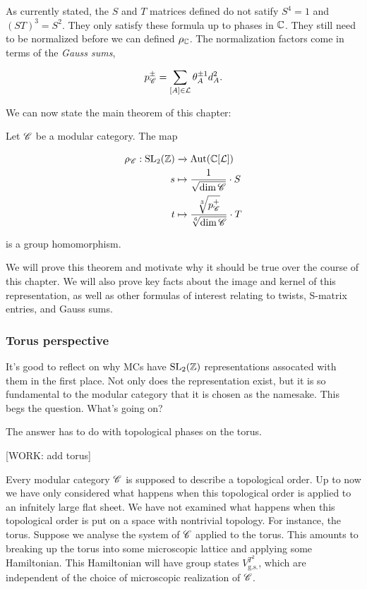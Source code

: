 As currently stated, the $S$ and $T$ matrices defined do not satify $S^4=1$ and $(ST)^3=S^2$. They only satisfy these formula up to phases in $\mathbb{C}$. They still need to be normalized before we can defined $\rho_{\mathbb{C}}$. The normalization factors come in terms of the \textit{Gauss sums},

$$p^{\pm}_{\mathscr{C}}=\sum_{[A]\in \mathcal{L}}\theta_A^{\pm 1}d_A^2.$$

We can now state the main theorem of this chapter:

\begin{theorem} Let $\mathscr{C}$ be a modular category. The map

\begin{align*}
\rho_{\mathscr{C}}:\operatorname{SL}_2(\mathbb{Z})&\xrightarrow{}\operatorname{Aut}(\mathbb{C}[\mathcal{L}])\\
s & \mapsto \frac{1}{\sqrt{\dim \mathscr{C}}}\cdot S\\ 
t & \mapsto \frac{\sqrt[3]{p_{\mathscr{C}}^{+}}}{\sqrt[6]{\dim \mathscr{C}}}\cdot T
\end{align*}

is a group homomorphism.
\end{theorem}

We will prove this theorem and motivate why it should be true over the course of this chapter. We will also prove key facts about the image and kernel of this representation, as well as other formulas of interest relating to twists, S-matrix entries, and Gauss sums.

\subsubsection{Torus perspective}

It's good to reflect on why MCs have $\operatorname{SL}_2(\mathbb{Z})$ representations assocated with them in the first place. Not only does the representation exist, but it is so fundamental to the modular category that it is chosen as the namesake. This begs the question. What's going on?

The answer has to do with topological phases on the torus.

[WORK: add torus]

Every modular category $\mathscr{C}$ is supposed to describe a topological order. Up to now we have only considered what happens when this topological order is applied to an infnitely large flat sheet. We have not examined what happens when this topological order is put on a space with nontrivial topology. For instance, the torus. Suppose we analyse the system of $\mathscr{C}$ applied to the torus. This amounts to breaking up the torus into some microscopic lattice and applying some Hamiltonian. This Hamiltonian will have group states $V_{\text{g.s.}}^{T^2}$, which are independent of the choice of microscopic realization of $\mathscr{C}$.

